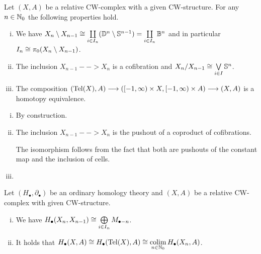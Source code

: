 
	\begin{lemma}
		Let $(X,A)$ be a relative CW-complex with a given CW-structure. For any $n \in \mathbb{N}_0$ the following properties hold. 
		\begin{enumerate}[(i)]
			\item{
				We have $X_n \setminus X_{n-1} \cong \coprod \limits_{i \in I_n} (\mathbb{D}^n \setminus \mathbb{S}^{n-1}) = \coprod \limits_{i \in I_n} \mathbb{B}^n$ and in particular $I_n \cong \pi_0(X_n \setminus X_{n-1})$.
			}
			\item{
				The inclusion $X_{n-1}-->X_n$ is a cofibration and $X_n / X_{n-1} \cong \operatorname*{\bigvee} \limits_{i \in I} \mathbb{S}^n$.
			}
			\item{
				The composition $(\operatorname{Tel}(X),A) --> ([-1,\infty)\times X,[-1,\infty)\times A) --> (X,A)$ is a homotopy equivalence.
			}
		\end{enumerate}
	\end{lemma}
	\begin{sketch}
		\begin{enumerate}[(i)]
			\item{
				By construction.
			}
			\item{
				The inclusion $X_{n-1}-->X_n$ is the pushout of a coproduct of cofibrations.

				The isomorphism follows from the fact that both are pushouts of the constant map and the inclusion of cells.
			}
			\item{

			}
		\end{enumerate}
	\end{sketch}

	\begin{corollary}
		Let $(H_\bullet, \partial_\bullet)$ be an ordinary homology theory and $(X,A)$ be a relative CW-complex with given CW-structure.
		\begin{enumerate}[(i)]
			\item{
				We have $H_\bullet(X_n,X_{n-1}) \cong \bigoplus \limits_{i \in I_n}M_{\bullet-n}$.%
			}
			\item{
				It holds that $H_\bullet(X,A) \cong H_\bullet(\operatorname{Tel} (X), A) \cong \operatorname*{colim} \limits_{n \in \mathbb{N}_0} H_\bullet(X_n,A)$.
			}
		\end{enumerate}
	\end{corollary}

